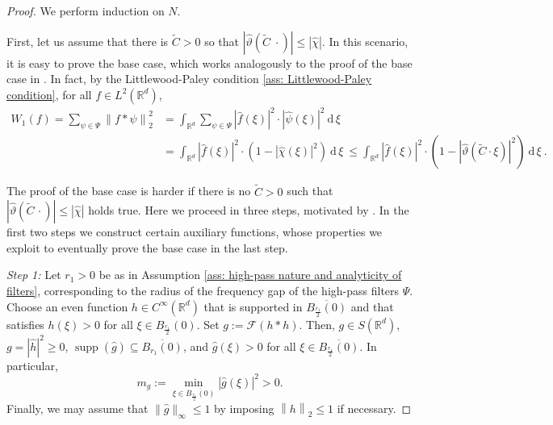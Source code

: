 \documentclass[11pt]{amsart}
\newcommand{\R}{{\mathbb{R}}}
\newcommand{\dxi}{\:\mathrm{d}\,\xi\:}
\newcommand{\norm}[1]{\ensuremath{\left\lVert\text{}#1\text{}\right\rVert}}
\DeclareMathOperator{\supp}{supp}
\newenvironment{proof sketch} {\textit{Proof sketch.}}{}
\begin{document}
  \begin{proof}
    We perform induction on $N$. 
  
    First, let us assume that there is $\widetilde{C}>0$ so that $|\widehat{\vartheta}(\widetilde{C}\;\cdot)| \leq |\widehat{\chi}|$. In this scenario, it is easy to prove the base case, which works analogously to the proof of the base case in \cite[Theorem 1]{wiatowski2017energy}. In fact, by the Littlewood-Paley condition \eqref{ass: Littlewood-Paley condition}, for all $f \in L^2(\R^d)$, 
    \begin{align*}
      W_1(f)=\sum_{\psi \in \Psi} \norm{f*\psi}_2^2 
      &= \int_{\R^d} \sum_{\psi \in \Psi} |\widehat{f}(\xi)|^2 \cdot |\widehat{\psi}(\xi)|^2  \dxi \\
      &= \int_{\R^d} |\widehat{f}(\xi)|^2 \cdot (1-|\widehat{\chi}(\xi)|^2) \dxi
      \leq \int_{\R^d} |\widehat{f}(\xi)|^2 \cdot (1-|\widehat{\vartheta}(\widetilde{C} \cdot \xi)|^2) \dxi.
    \end{align*}
    
    The proof of the base case is harder if there is no $\widetilde{C}>0$ such that $|\widehat{\vartheta}(\widetilde{C}\,\cdot)| \leq |\widehat{\chi}|$ holds true. Here we proceed in three steps, motivated by \cite[Section 6.3]{waldspurger2017exponential}. In the first two steps we construct certain auxiliary functions, whose properties we exploit to eventually prove the base case in the last step.
  
    \textit{Step 1:} Let $r_1>0$ be as in Assumption \ref{ass: high-pass nature and analyticity of filters}, corresponding to the radius of the frequency gap of the high-pass filters $\Psi$. Choose an even function $h \in C^\infty(\R^d)$ that is supported in $\overline{B_{\frac{r_1}{2}}(0)}$ and that satisfies $h(\xi)>0$ for all $\xi \in B_{\frac{r_1}{2}}(0)$. Set $g:=\mathcal{F}(h*h)$. Then, $g \in S(\R^d)$, $g=|\widehat{h}|^2 \geq 0$, $\supp(\widehat{g})\subseteq \overline{B_{r_1}(0)}$, and $\widehat{g}(\xi)>0$ for all $\xi \in \overline{B_{\frac{r_1}{2}}(0)}$. In particular, \[m_g:=\min_{\xi \in \overline{B_{\frac{r_1}{2}}(0)}} |\widehat{g}(\xi)|^2>0.\] 
    Finally, we may assume that $\|\widehat{g}\|_{\infty}\leq 1$ by imposing $\norm{h}_2\leq 1$ if necessary.
  

\end{proof}
\end{document}
